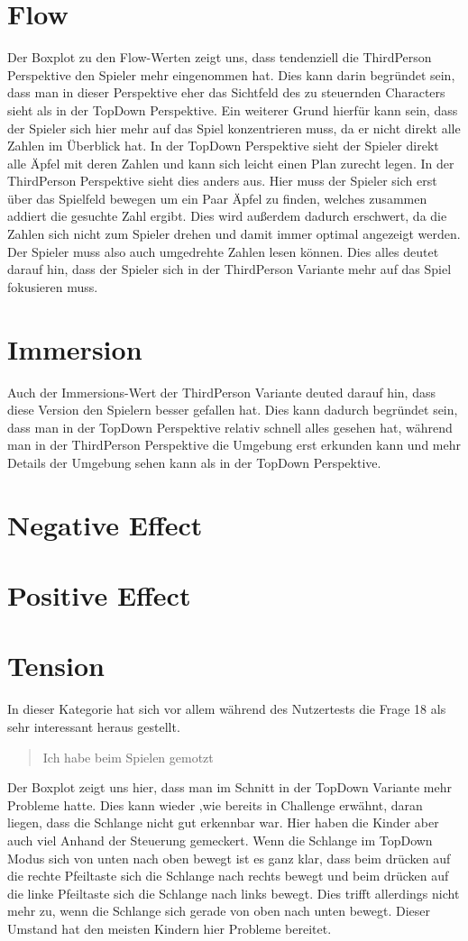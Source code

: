\section{Flow}
Der Boxplot zu den Flow-Werten zeigt uns, dass tendenziell die ThirdPerson Perspektive den Spieler mehr eingenommen hat. Dies kann darin begründet sein, dass man in dieser Perspektive eher das Sichtfeld des zu steuernden Characters sieht als in der TopDown Perspektive. Ein weiterer Grund hierfür kann sein, dass der Spieler sich hier mehr auf das Spiel konzentrieren muss, da er nicht direkt alle Zahlen im Überblick hat. In der TopDown Perspektive sieht der Spieler direkt alle Äpfel mit deren Zahlen und kann sich leicht einen Plan zurecht legen. In der ThirdPerson Perspektive sieht dies anders aus. Hier muss der Spieler sich erst über das Spielfeld bewegen um ein Paar Äpfel zu finden, welches zusammen addiert die gesuchte Zahl ergibt. Dies wird außerdem dadurch erschwert, da die Zahlen sich nicht zum Spieler drehen und damit immer optimal angezeigt werden. Der Spieler muss also auch umgedrehte Zahlen lesen können. Dies alles deutet darauf hin, dass der Spieler sich in der ThirdPerson Variante mehr auf das Spiel fokusieren muss. 
\section{Immersion}
Auch der Immersions-Wert der ThirdPerson Variante deuted darauf hin, dass diese Version den Spielern besser gefallen hat. Dies kann dadurch begründet sein, dass man in der TopDown Perspektive relativ schnell alles gesehen hat, während man in der ThirdPerson Perspektive die Umgebung erst erkunden kann und mehr Details der Umgebung sehen kann als in der TopDown Perspektive.
\section{Negative Effect}

\section{Positive Effect}

\section{Tension}
In dieser Kategorie hat sich vor allem während des Nutzertests die Frage 18 als sehr interessant heraus gestellt.
\begin{quote}
Ich habe beim Spielen gemotzt
\end{quote}
Der Boxplot zeigt uns hier, dass man im Schnitt in der TopDown Variante mehr Probleme hatte. Dies kann wieder ,wie bereits in Challenge erwähnt, daran liegen, dass die Schlange nicht gut erkennbar war. Hier haben die Kinder aber auch viel Anhand der Steuerung gemeckert. Wenn die Schlange im TopDown Modus sich von unten nach oben bewegt ist es ganz klar, dass beim drücken auf die rechte Pfeiltaste sich die Schlange nach rechts bewegt und beim drücken auf die linke Pfeiltaste sich die Schlange nach links bewegt. Dies trifft allerdings nicht mehr zu, wenn die Schlange sich gerade von oben nach unten bewegt. Dieser Umstand hat den meisten Kindern hier Probleme bereitet.

